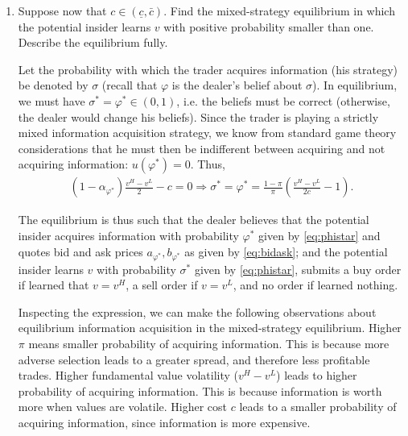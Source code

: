 \documentclass[11pt
, answers
]{exam}
\begin{document}
\begin{enumerate} [label=(\alph*). ]
\item Suppose now that $c \in (\underline{c}, \bar{c})$. Find the mixed-strategy equilibrium in which the potential insider learns $v$ with positive probability smaller than one. Describe the equilibrium fully.

\begin{solution}
	Let the probability with which the trader acquires information (his strategy) be denoted by $\sigma$ (recall that $\varphi$ is the dealer's belief about $\sigma$). In equilibrium, we must have $\sigma^*=\varphi^* \in (0,1)$, i.e. the beliefs must be correct (otherwise, the dealer would change his beliefs). Since the trader is playing a strictly mixed information acquisition strategy, we know from standard game theory considerations that he must then be indifferent between acquiring and not acquiring information: $u(\varphi^*)=0$. Thus,
	\begin{align}
		\label{eq:phistar}
		(1-\alpha_{\varphi^*})\frac{v^H-v^L}{2}-c = 0 \Rightarrow \sigma^*=\varphi^* = \frac{1-\pi}{\pi} \left(\frac{v^H-v^L}{2c} -1 \right).
	\end{align}
	
	The equilibrium is thus such that the dealer believes that the potential insider acquires information with probability $\varphi^*$ given by \eqref{eq:phistar} and quotes bid and ask prices $a_{\varphi^*}, b_{\varphi^*}$ as given by \eqref{eq:bidask}; and the potential insider learns $v$ with probability $\sigma^*$ given by \eqref{eq:phistar}, submits a buy order if learned that $v = v^H$, a sell order if $v = v^L$, and no order if learned nothing.

	Inspecting the expression, we can make the following observations about equilibrium information acquisition in the mixed-strategy equilibrium. Higher $\pi$ means smaller probability of acquiring information. This is because more adverse selection leads to a greater spread, and therefore less profitable trades. Higher fundamental value volatility ($v^H-v^L$) leads to higher probability of acquiring information. This is because information is worth more when values are volatile. Higher cost $c$ leads to a smaller probability of acquiring information, since information is more expensive.
\end{solution}


%
%  
%  

\end{enumerate}
\end{document}

